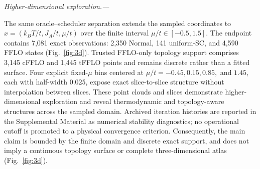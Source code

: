 \FloatBarrier


\textit{Higher-dimensional exploration.---}

The same oracle--scheduler separation extends the sampled coordinates to $x=(k_BT/t,J_A/t,\mu/t)$ over the finite interval $\mu/t\in[-0.5,1.5]$. The endpoint contains 7,081 exact observations: 2,350 Normal, 141 uniform-SC, and 4,590 FFLO states (Fig.~\ref{fig:3d}). Trusted FFLO-only topology support comprises 3,145 cFFLO and 1,445 tFFLO points and remains discrete rather than a fitted surface. Four explicit fixed-$\mu$ bins centered at $\mu/t=-0.45,0.15,0.85,$ and $1.45$, each with half-width 0.025, expose exact slice-to-slice structure without interpolation between slices. These point clouds and slices demonstrate higher-dimensional exploration and reveal thermodynamic and topology-aware structures across the sampled domain. Archived iteration histories are reported in the Supplemental Material as numerical stability diagnostics; no operational cutoff is promoted to a physical convergence criterion. Consequently, the main claim is bounded by the finite domain and discrete exact support, and does not imply a continuous topology surface or complete three-dimensional atlas (Fig.~\ref{fig:3d}).

\FloatBarrier
